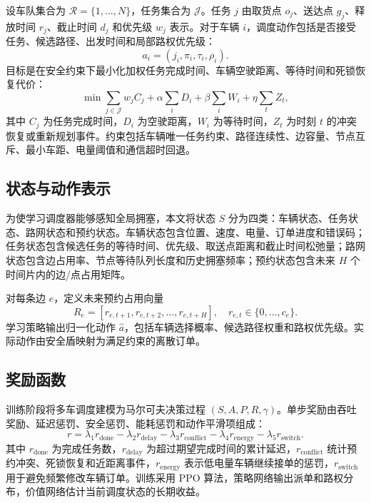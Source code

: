 \documentclass[UTF8,twocolumn,11pt]{ctexart}
\begin{document}
设车队集合为 $\mathcal{R}=\{1,\ldots,N\}$，任务集合为 $\mathcal{J}$。任务 $j$ 由取货点 $o_j$、送达点 $g_j$、释放时间 $r_j$、截止时间 $d_j$ 和优先级 $w_j$ 表示。对于车辆 $i$，调度动作包括是否接受任务、候选路径、出发时间和局部路权优先级：
\begin{equation}
  a_i=(j_i,\pi_i,\tau_i,\rho_i).
\end{equation}
目标是在安全约束下最小化加权任务完成时间、车辆空驶距离、等待时间和死锁恢复代价：
\begin{equation}
\min \sum_{j\in\mathcal{J}} w_j C_j
 + \alpha \sum_i D_i
 + \beta \sum_i W_i
 + \eta \sum_t Z_t ,
\label{eq:objective}
\end{equation}
其中 $C_j$ 为任务完成时间，$D_i$ 为空驶距离，$W_i$ 为等待时间，$Z_t$ 为时刻 $t$ 的冲突恢复或重新规划事件。约束包括车辆唯一任务约束、路径连续性、边容量、节点互斥、最小车距、电量阈值和通信超时回退。

\subsection{状态与动作表示}

为使学习调度器能够感知全局拥塞，本文将状态 $S$ 分为四类：车辆状态、任务状态、路网状态和预约状态。车辆状态包含位置、速度、电量、订单进度和错误码；任务状态包含候选任务的等待时间、优先级、取送点距离和截止时间松弛量；路网状态包含边占用率、节点等待队列长度和历史拥塞频率；预约状态包含未来 $H$ 个时间片内的边/点占用矩阵。

对每条边 $e$，定义未来预约占用向量
\begin{equation}
  R_e=[r_{e,t+1},r_{e,t+2},\ldots,r_{e,t+H}], \quad r_{e,t}\in\{0,\ldots,c_e\}.
\end{equation}
学习策略输出归一化动作 $\hat{a}$，包括车辆选择概率、候选路径权重和路权优先级。实际动作由安全盾映射为满足约束的离散订单。

\subsection{奖励函数}

训练阶段将多车调度建模为马尔可夫决策过程 $(S,A,P,R,\gamma)$。单步奖励由吞吐奖励、延迟惩罚、安全惩罚、能耗惩罚和动作平滑项组成：
\begin{equation}
  r = \lambda_1 r_{\mathrm{done}}
    - \lambda_2 r_{\mathrm{delay}}
    - \lambda_3 r_{\mathrm{conflict}}
    - \lambda_4 r_{\mathrm{energy}}
    - \lambda_5 r_{\mathrm{switch}} .
\end{equation}
其中 $r_{\mathrm{done}}$ 为完成任务数，$r_{\mathrm{delay}}$ 为超过期望完成时间的累计延迟，$r_{\mathrm{conflict}}$ 统计预约冲突、死锁恢复和近距离事件，$r_{\mathrm{energy}}$ 表示低电量车辆继续接单的惩罚，$r_{\mathrm{switch}}$ 用于避免频繁修改车辆订单。训练采用 PPO 算法，策略网络输出派单和路权分布，价值网络估计当前调度状态的长期收益。
\end{document}
